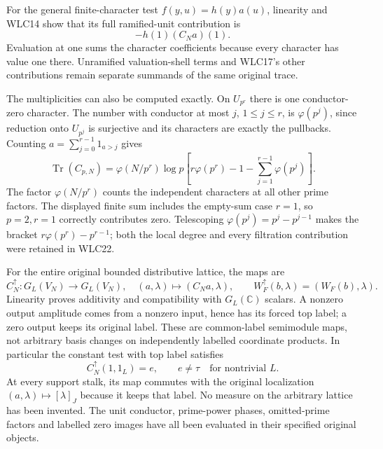 For the general finite-character test $f(y,u)=h(y)a(u)$, linearity
and WLC14 show that its full ramified-unit contribution is
\begin{equation}\tag{WLC21}
 -h(1)(C_Na)(1).
\end{equation}
Evaluation at one sums the character coefficients because every
character has value one there. Unramified valuation-shell terms
and WLC17's other contributions remain separate summands of
the same original trace.

The multiplicities can also be computed exactly. On $U_{p^r}$
there is one conductor-zero character. The number with conductor
at most $j$, $1\le j\le r$, is $\varphi(p^j)$, since reduction
onto $U_{p^j}$ is surjective and its characters are exactly the
pullbacks. Counting $a=\sum_{j=0}^{r-1}1_{a>j}$ gives
\begin{equation}\tag{WLC22}
 \operatorname{Tr}(C_{p,N})=
 \varphi(N/p^r)\log p
 \left[r\varphi(p^r)-1-\sum_{j=1}^{r-1}\varphi(p^j)\right].
\end{equation}
The factor $\varphi(N/p^r)$ counts the independent characters
at all other prime factors. The displayed finite sum includes
the empty-sum case $r=1$, so $p=2,r=1$ correctly contributes
zero. Telescoping $\varphi(p^j)=p^j-p^{j-1}$ makes the bracket
$r\varphi(p^r)-p^{r-1}$; both the local degree and every
filtration contribution were retained in WLC22.

For the entire original bounded distributive lattice, the maps are
\begin{equation}\tag{WLC23}
 C_N^\uparrow:G_L(V_N)\longrightarrow G_L(V_N),\quad
 (a,\lambda)\longmapsto(C_Na,\lambda),\qquad
 W_F^\uparrow(b,\lambda)=(W_F(b),\lambda).
\end{equation}
Linearity proves additivity and compatibility with
$G_L(\mathbb C)$ scalars. A nonzero output amplitude comes
from a nonzero input, hence has its forced top label; a zero
output keeps its original label. These are common-label
semimodule maps, not arbitrary basis changes on independently
labelled coordinate products. In particular the constant test
with top label satisfies
\begin{equation}\tag{WLC24}
 C_N^\uparrow(1,1_L)=e,\qquad e\ne\tau
 \quad\text{for nontrivial }L.
\end{equation}
At every support stalk, its map commutes with the original
localization $(a,\lambda)\mapsto[\lambda]_J$ because it keeps
that label. No measure on the arbitrary lattice has been
invented. The unit conductor, prime-power phases, omitted-prime
factors and labelled zero images have all been evaluated in
their specified original objects.
